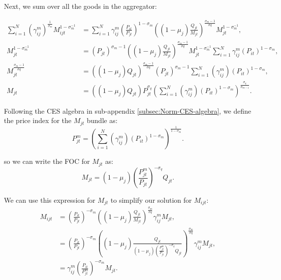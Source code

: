 Next, we sum over all the goods in the aggregator:

\begin{align*}
\sum_{i=1}^{N}\left(\gamma_{ij}^{m}\right)^{\frac{{1}}{\sigma_{m}}}M_{ijt}^{1-\sigma_{m}^{-1}} & =\sum_{i=1}^{N}\gamma_{ij}^{m}\left(\frac{P_{it}}{P_{jt}}\right)^{1-\sigma_{m}}\left(\left(1-\mu_{j}\right)\frac{{Q_{jt}}}{M_{jt}}\right)^{\frac{{\sigma_{m}-1}}{\sigma q}}M_{jt}^{1-\sigma_{m}^{-1}},\\
M_{jt}^{1-\sigma_{m}^{-1}} & =(P_{jt})^{\sigma_{m}-1}\left(\left(1-\mu_{j}\right)\frac{Q_{jt}}{M_{jt}}\right)^{\frac{{\sigma_{m}-1}}{\sigma q}}M_{jt}^{1-\sigma_{m}^{-1}}\sum_{i=1}^{N}\gamma_{ij}^{m}\left(P_{it}\right)^{1-\sigma_{m}},\\
M_{jt}^{\frac{{\sigma_{m}-1}}{\sigma q}} & =\left(\left(1-\mu_{j}\right)Q_{jt}\right)^{\frac{{\sigma_{m}-1}}{\sigma q}}(P_{jt})^{\sigma_{m}-1}\sum_{i=1}^{N}\left(\gamma_{ij}^{m}\right)\left(P_{it}\right)^{1-\sigma_{m}},\\
M_{jt} & =\left(\left(1-\mu_{j}\right)Q_{jt}\right)P_{jt}^{\sigma_{q}}\left(\sum_{i=1}^{N}\left(\gamma_{ij}^{m}\right)\left(P_{it}\right)^{1-\sigma_{m}}\right)^{\frac{{\sigma_{q}}}{\sigma_{m-1}}}.
\end{align*}

Following the CES algebra in sub-appendix \ref{subsec:Norm-CES-algebra},
we define the price index for the $M_{jt}$ bundle as:
\[
P_{jt}^{m}=\left(\sum_{i=1}^{N}\left(\gamma_{ij}^{m}\right)\left(P_{it}\right)^{1-\sigma_{m}}\right)^{\frac{{1}}{1-\sigma_{m}}}.
\]

so we can write the FOC for $M_{jt}$ as:
\[
M_{jt}=\left(1-\mu_{j}\right)\left(\frac{P_{jt}^{m}}{P_{jt}}\right)^{-\sigma_{q}}Q_{jt}.
\]

We can use this expression for $M_{jt}$ to simplify our solution for
$M_{ijt}$:
\begin{align*}
M_{ijt} & =\left(\frac{{P_{it}}}{P_{jt}}\right)^{-\sigma_{m}}\left(\left(1-\mu_{j}\right)\frac{Q_{jt}}{M_{jt}}\right)^{\frac{{\sigma_{m}}}{\sigma q}}\gamma_{ij}^{m}M_{jt},\\
 & = \left(\frac{{P_{it}}}{P_{jt}}\right)^{-\sigma_{m}}\left(\left(1-\mu_{j}\right)\frac{Q_{jt}}{\left(1-\mu_{j}\right)\left(\frac{P_{jt}^{m}}{P_{jt}}\right)^{-\sigma_{q}}Q_{jt}}\right)^{\frac{{\sigma_{m}}}{\sigma q}}\gamma_{ij}^{m}M_{jt},\\
 & =\gamma_{ij}^{m}\left(\frac{{P_{it}}}{P_{jt}^{m}}\right)^{-\sigma_{m}}M_{jt}.
\end{align*}

